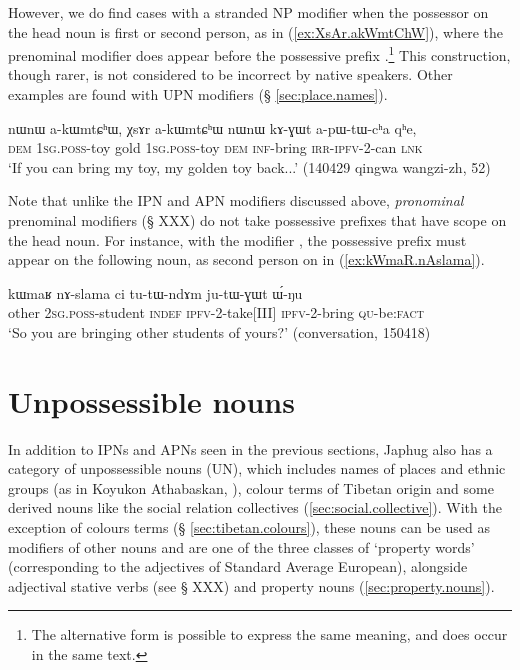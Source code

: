 However, we do find cases with a stranded NP modifier when the possessor on the head noun is first or second person, as in (\ref{ex:XsAr.akWmtChW}), where the prenominal modifier  does appear before the possessive prefix .\footnote{The alternative form  is possible to express the same meaning, and does occur in the same text. } This construction, though rarer, is not considered to be incorrect by native speakers. Other examples are found with UPN modifiers (§ \ref{sec:place.names}).

\begin{exe}
\ex \label{ex:XsAr.akWmtChW}
\gll  nɯnɯ a-kɯmtɕʰɯ, χsɤr a-kɯmtɕʰɯ nɯnɯ kɤ-ɣɯt a-pɯ-tɯ-cʰa qʰe,  \\
\textsc{dem} \textsc{1sg}.\textsc{poss}-toy gold \textsc{1sg}.\textsc{poss}-toy \textsc{dem} \textsc{inf}-bring \textsc{irr}-\textsc{ipfv}-2-can \textsc{lnk} \\
\glt `If you can bring my toy, my golden toy back...' (140429 qingwa wangzi-zh, 52)
\end{exe}

Note that unlike the IPN and APN modifiers discussed above, \textit{pronominal} prenominal modifiers (§ XXX) do not take possessive prefixes that have scope on the head noun. For instance, with the modifier , the possessive prefix must appear on the following noun, as second person  on  in (\ref{ex:kWmaR.nAslama}).

\begin{exe}
\ex \label{ex:kWmaR.nAslama}
 \gll  kɯmaʁ nɤ-slama ci tu-tɯ-ndɤm ju-tɯ-ɣɯt ɯ́-ŋu \\
 other \textsc{2sg}.\textsc{poss}-student \textsc{indef} \textsc{ipfv}-2-take[III] \textsc{ipfv}-2-bring \textsc{qu}-be:\textsc{fact} \\
 \glt `So you are bringing other students of yours?' (conversation, 150418)
\end{exe}

 

\section{Unpossessible nouns} \label{sec:unpossessible.nouns}
In addition to IPNs and APNs seen in the previous sections, Japhug also has a category of unpossessible nouns (UN), which includes names of places and ethnic groups (as in Koyukon Athabaskan, \citealt[651]{thompson96koyukon}), colour terms of Tibetan origin and some derived nouns like the social relation collectives (\ref{sec:social.collective}). With the exception of colours terms (§ \ref{sec:tibetan.colours}), these nouns can be used as modifiers of other nouns and are one of the three classes of `property words' (corresponding to the adjectives of Standard Average European),  alongside adjectival stative verbs (see § XXX) and property nouns (\ref{sec:property.nouns}).

